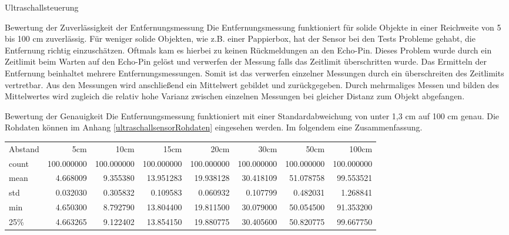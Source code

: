 \documentclass[12pt,twoside]{report}
\begin{document}
\begin{section}{Ultraschallsteuerung}
    \begin{subsection}{Bewertung der Zuverlässigkeit der Entfernungsmessung}
      Die Entfernungsmessung funktioniert für solide Objekte in einer Reichweite
      von 5 bis 100 cm zuverlässig. Für weniger solide Objekten, wie z.B. einer
      Pappierbox, hat der Sensor bei den Tests Probleme
      gehabt, die Entfernung richtig einzuschätzen. Oftmals kam es hierbei zu keinen Rückmeldungen an den Echo-Pin. Dieses
      Problem wurde durch ein Zeitlimit beim Warten auf den Echo-Pin gelöst und
      verwerfen der Messung falls das Zeitlimit überschritten wurde. Das
      Ermitteln der Entfernung beinhaltet mehrere Entfernungsmessungen. Somit
      ist das verwerfen einzelner Messungen durch ein überschreiten des
      Zeitlimits vertretbar. Aus den Messungen wird anschließend ein Mittelwert
      gebildet und zurückgegeben. Durch mehrmaliges Messen und bilden des
      Mittelwertes wird zugleich die relativ hohe Varianz zwischen einzelnen
      Messungen bei gleicher Distanz zum Objekt abgefangen.
    \end{subsection}
    \begin{subsection}{Bewertung der Genauigkeit}
      Die Entfernungsmessung funktioniert mit einer Standardabweichung von unter
      1,3 cm auf 100 cm genau.
      Die Rohdaten können im Anhang \ref{ultraschallsensorRohdaten} eingesehen werden.
      Im folgendem eine Zusammenfassung.
      \begin{table}[h!]
        \begin{tabular}{lrrrrrrr}
          Abstand &       5cm &        10cm &        15cm &        20cm &        30cm &        50cm &       100cm \\
          count &  100.000000 &  100.000000 &  100.000000 &  100.000000 &  100.000000 &  100.000000 &  100.000000 \\
          mean  &    4.668009 &    9.355380 &   13.951283 &   19.938128 &   30.418109 &   51.078758 &   99.553521 \\
          std   &    0.032030 &    0.305832 &    0.109583 &    0.060932 &    0.107799 &    0.482031 &    1.268841 \\
          min   &    4.650300 &    8.792790 &   13.804400 &   19.811500 &   30.079000 &   50.054500 &   91.353200 \\
          25\%   &    4.663265 &    9.122402 &   13.854150 &   19.880775 &   30.405600 &   50.820775 &   99.667750 \\

\end{tabular}
\end{table}
\end{subsection}
\end{section}
\end{document}
